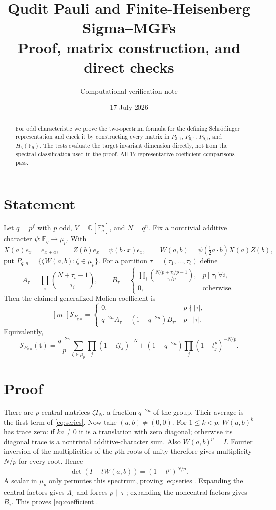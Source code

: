 \documentclass[11pt]{article}
\title{\color{navy}\bfseries Qudit Pauli and Finite-Heisenberg Sigma--MGFs\\\large Proof, matrix construction, and direct checks}
\author{Computational verification note}\date{17 July 2026}
\newcommand{\Sgm}{\mathcal S}
\newcommand{\F}{\mathbb F}
\begin{document}
\maketitle

\begin{abstract}
For odd characteristic we prove the two-spectrum formula for the defining
Schrödinger representation and check it by constructing every matrix in
$P_{3,1}$, $P_{5,1}$, $P_{9,1}$, and $H_3(\F_9)$.  The tests evaluate the
target invariant dimension directly, not from the spectral classification
used in the proof.  All 17 representative coefficient comparisons pass.
\end{abstract}

\section{Statement}
Let $q=p^f$ with $p$ odd, $V=\mathbb C[\F_q^n]$, and $N=q^n$.  Fix a
nontrivial additive character $\psi:\F_q\to\mu_p$.  With
\[
X(a)e_x=e_{x+a},\qquad Z(b)e_x=\psi(b\cdot x)e_x,
\qquad W(a,b)=\psi\!\left(\tfrac12a\cdot b\right)X(a)Z(b),
\]
put $P_{q,n}=\{\zeta W(a,b):\zeta\in\mu_p\}$.  For a partition
$\tau=(\tau_1,\ldots,\tau_\ell)$ define
\[
A_\tau=\prod_i\binom{N+\tau_i-1}{\tau_i},\qquad
B_\tau=\begin{cases}
\displaystyle\prod_i\binom{N/p+\tau_i/p-1}{\tau_i/p},&p\mid\tau_i\ \forall i,\\
0,&\text{otherwise.}
\end{cases}
\]
Then the claimed generalized Molien coefficient is
\begin{equation}\label{eq:coefficient}
[m_\tau]\Sgm_{P_{q,n}}=
\begin{cases}
0,&p\nmid |\tau|,\\
q^{-2n}A_\tau+(1-q^{-2n})B_\tau,&p\mid |\tau|.
\end{cases}
\end{equation}
Equivalently,
\begin{equation}\label{eq:series}
\Sgm_{P_{q,n}}(\mathbf t)=
\frac{q^{-2n}}p\sum_{\zeta\in\mu_p}\prod_j(1-\zeta t_j)^{-N}
+(1-q^{-2n})\prod_j(1-t_j^p)^{-N/p}.
\end{equation}

\section{Proof}
There are $p$ central matrices $\zeta I_N$, a fraction $q^{-2n}$ of the
group.  Their average is the first term of \eqref{eq:series}.  Now take
$(a,b)\ne(0,0)$.  For $1\le k<p$, $W(a,b)^k$ has trace zero: if $ka\ne0$
it is a translation with zero diagonal; otherwise its diagonal trace is a
nontrivial additive-character sum.  Also $W(a,b)^p=I$.  Fourier inversion of
the multiplicities of the $p$th roots of unity therefore gives multiplicity
$N/p$ for every root.  Hence
\[
\det(I-tW(a,b))=(1-t^p)^{N/p}.
\]
A scalar in $\mu_p$ only permutes this spectrum, proving \eqref{eq:series}.
Expanding the central factors gives $A_\tau$ and forces $p\mid|\tau|$;
expanding the noncentral factors gives $B_\tau$.  This proves
\eqref{eq:coefficient}.
\end{document}
